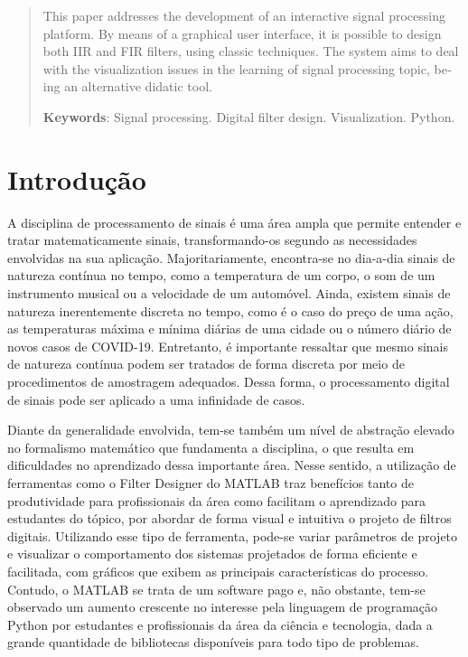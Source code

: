 \documentclass[12pt,a4paper]{report}
\begin{document}
\begin{otherlanguage}{english}
  \begin{abstract}
    This paper addresses the development of an interactive signal processing platform. By means of a graphical
    user interface, it is possible to design both IIR and FIR filters, using classic techniques. The system
    aims to deal with the visualization issues in the learning of signal processing topic, being an alternative
    didatic tool.

    \textbf{Keywords}: Signal processing. Digital filter design. Visualization. Python.
  \end{abstract}
\end{otherlanguage}

{
  \center
  \listoffigures
  \pagestyle{empty}
  \clearpage
}

{
  \center
  \tableofcontents
  \thispagestyle{empty}
  \clearpage
}

\thispagestyle{empty}
\clearpage
\onehalfspacing

\chapter{Introdução}
  A disciplina de processamento de sinais é uma área ampla que permite entender e tratar matematicamente
  sinais, transformando-os segundo as necessidades envolvidas na sua aplicação. Majoritariamente, encontra-se
  no dia-a-dia sinais de natureza contínua no tempo, como a temperatura de um corpo, o som de um instrumento
  musical ou a velocidade de um automóvel. Ainda, existem sinais de natureza inerentemente discreta no tempo,
  como é o caso do preço de uma ação, as temperaturas máxima e mínima diárias de uma cidade ou o número diário
  de novos casos de COVID-19. Entretanto, é importante ressaltar que mesmo sinais de natureza contínua  podem
  ser tratados de forma discreta por meio de procedimentos de amostragem adequados. Dessa forma, o processamento
  digital de sinais pode ser aplicado a uma infinidade de casos.

  Diante da generalidade envolvida, tem-se também um nível de abstração elevado no formalismo matemático que
  fundamenta a disciplina, o que resulta em dificuldades no aprendizado dessa importante área. Nesse sentido,
  a utilização de ferramentas como o Filter Designer do MATLAB traz benefícios tanto de produtividade para
  profissionais da área como facilitam o aprendizado para estudantes do tópico, por abordar de forma visual e
  intuitiva o projeto de filtros digitais. Utilizando esse tipo de ferramenta, pode-se variar parâmetros de
  projeto e visualizar o comportamento dos sistemas projetados de forma eficiente e facilitada, com gráficos que
  exibem as principais características do processo. Contudo, o MATLAB se trata de um software pago e, não
  obstante, tem-se observado um aumento crescente no interesse pela linguagem de programação Python por
  estudantes e profissionais da área da ciência e tecnologia, dada a grande quantidade de bibliotecas disponíveis
  para todo tipo de problemas.
\end{document}
